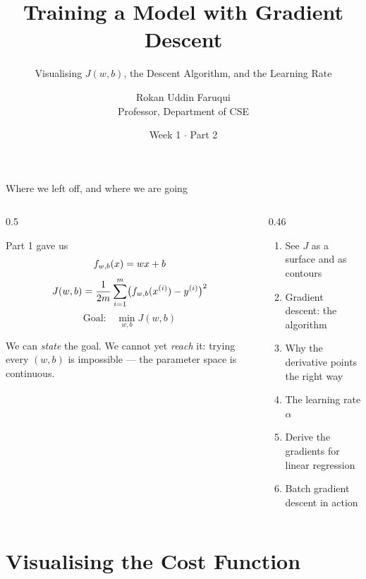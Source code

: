 \documentclass[aspectratio=169,10pt]{beamer}
\title[CSE 815 -- Week 1, Part 2]{Training a Model with Gradient Descent}
\subtitle{Visualising $J(w,b)$, the Descent Algorithm, and the Learning Rate}
\author{Rokan Uddin Faruqui\\ \small Professor, Department of CSE}
\institute{\small University of Chittagong \\ \texttt{rufaruqui@cu.ac.bd}}
\date[Week 1 / P 2]{ Week 1 $\cdot$ Part 2 }
\begin{document}
\begin{frame}
  \titlepage
\end{frame}

\begin{frame}{Where we left off, and where we are going}
  \begin{columns}[T,onlytextwidth]
    \begin{column}{0.5\textwidth}
      \begin{block}{Part 1 gave us}
        \[ f_{w,b}(x)=wx+b \]
        \[ J(w,b)=\frac{1}{2m}\sum_{i=1}^{m}\bigl(f_{w,b}(x^{(i)})-y^{(i)}\bigr)^2 \]
        \[ \text{Goal:}\quad \min_{w,b} J(w,b) \]
      \end{block}
      \small We can \emph{state} the goal. We cannot yet \emph{reach} it: trying
      every $(w,b)$ is impossible --- the parameter space is continuous.
    \end{column}
    \begin{column}{0.46\textwidth}
      \begin{keyidea}[Today]
        \small
        \begin{enumerate}
          \item See $J$ as a surface and as contours 
          \item Gradient descent: the algorithm 
          \item Why the derivative points the right way 
          \item The learning rate $\alpha$ 
          \item Derive the gradients for linear regression 
          \item Batch gradient descent in action 
        \end{enumerate}
      \end{keyidea}
    \end{column}
  \end{columns}
\end{frame}

\section{Visualising the Cost Function}
\end{document}
